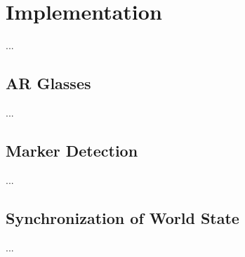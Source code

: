 \chapter{Implementation} \label{cha:implementation}
	...
	
	\section{AR Glasses} \label{sec:arglasses}
		...

	\section{Marker Detection} \label{sec:markerdetection}
		...
		
	\section{Synchronization of World State} \label{sec:synchronization}
		...
	
	